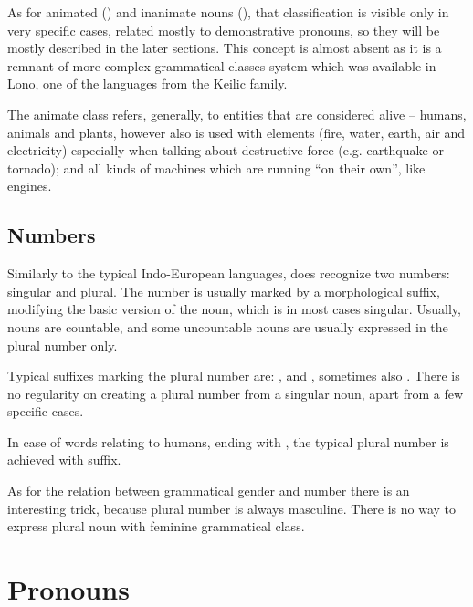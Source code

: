 As for animated (\An{}) and inanimate nouns (\Inan{}), that classification is
visible only in very specific cases, related mostly to demonstrative pronouns,
so they will be mostly described in the later sections. This concept is almost
absent as it is a remnant of more complex grammatical classes system which was
available in Lono, one of the languages from the Keilic family.

The animate class refers, generally, to entities that are considered alive --
humans, animals and plants, however also is used with elements (fire, water,
earth, air and electricity) especially when talking about destructive force
(e.g. earthquake or tornado); and all kinds of machines which are running ``on
their own'', like engines.


\subsection{Numbers}

Similarly to the typical Indo-European languages, \andro does recognize two
numbers: singular and plural. The number is usually marked by a morphological
suffix, modifying the basic version of the noun, which is in most cases
singular. Usually, nouns are countable, and some uncountable nouns are usually
expressed in the plural number only.


Typical suffixes marking the plural number are: ,  and ,
sometimes also . There is no regularity on creating a plural number from
a singular noun, apart from a few specific cases.

In case of words relating to humans, ending with , the typical plural
number is achieved with  suffix.

As for the relation between grammatical gender and number there is an
interesting trick, because plural number is always masculine. There is no way to
express plural noun with feminine grammatical class.

\section{Pronouns}
\label{sec:morph-pronouns}

